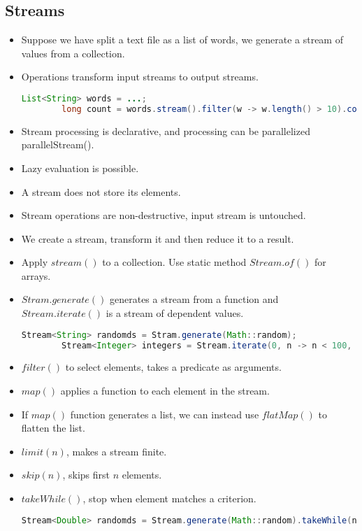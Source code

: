 \documentclass[a4paper]{article}
\begin{document}
\subsection{Streams}
\begin{itemize}
    \item Suppose we have split a text file as a list of words, we generate a stream of values from a collection.
    \item Operations transform input streams to output streams.
    \begin{lstlisting}[language=Java]
        List<String> words = ...;
        long count = words.stream().filter(w -> w.length() > 10).count();
    \end{lstlisting}
    \item Stream processing is declarative, and processing can be parallelized parallelStream().
    \item Lazy evaluation is possible.
    \item A stream does not store its elements.
    \item Stream operations are non-destructive, input stream is untouched.
    \item We create a stream, transform it and then reduce it to a result.
    \item Apply $stream()$ to a collection. Use static method $Stream.of()$ for arrays.
    \item $Stram.generate()$ generates a stream from a function and $Stream.iterate()$ is a stream of dependent values.
    \begin{lstlisting}[language=Java]
        Stream<String> randomds = Stram.generate(Math::random);
        Stream<Integer> integers = Stream.iterate(0, n -> n < 100, n -> n + 1);
    \end{lstlisting}
    \item $filter()$ to select elements, takes a predicate as arguments.
    \item $map()$ applies a function to each element in the stream.
    \item If $map()$ function generates a list, we can instead use $flatMap()$ to flatten the list.
    \item $limit(n)$, makes a stream finite.
    \item $skip(n)$, skips first $n$ elements.
    \item $takeWhile()$, stop when element matches a criterion.
    \begin{lstlisting}[language=Java]
        Stream<Double> randomds = Stream.generate(Math::random).takeWhile(n -> n >= 0.5)

\end{lstlisting}
\end{itemize}
\end{document}
